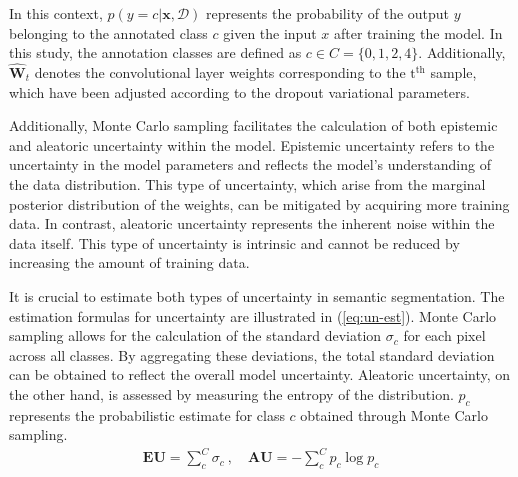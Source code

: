 In this context, $p(y=c|\mathbf{x},\mathcal{D})$ represents the probability of the output $y$ belonging to the 
annotated class $c$ given the input $x$ after training the model. In this study, the annotation classes are defined 
as $c \in C = \{0,1,2,4\}$. Additionally, $\widehat{\mathbf{W}}_{t}$ denotes the convolutional layer weights 
corresponding to the $\text{t}^{\text{th}}$ sample, which have been adjusted according to the dropout variational 
parameters. 

Additionally, Monte Carlo sampling facilitates the calculation of both epistemic and aleatoric uncertainty within 
the model. Epistemic uncertainty refers to the uncertainty in the model parameters and reflects the model's 
understanding of the data distribution. This type of uncertainty, which arise from the marginal posterior distribution 
of the weights, can be mitigated by acquiring more training data. In contrast, aleatoric uncertainty represents the 
inherent noise within the data itself. This type of uncertainty is intrinsic and cannot be reduced by increasing the 
amount of training data. 

It is crucial to estimate both types of uncertainty in semantic segmentation. The estimation formulas for uncertainty 
are illustrated in (\ref{eq:un-est}). Monte Carlo sampling allows for the calculation of the standard deviation 
$\sigma_c$ for each pixel across all classes. By aggregating these deviations, the total standard deviation can be 
obtained to reflect the overall model uncertainty. Aleatoric uncertainty, on the other hand, is assessed by measuring 
the entropy of the distribution. $p_{c}$ represents the probabilistic estimate for class $c$ obtained through Monte 
Carlo sampling. \\
\vspace{-2mm}
\begin{equation}
\begin{aligned}
    \mathbf{EU} = \sum_{c}^{C} \sigma_{c} \ , \quad
    \mathbf{AU} = -\sum_{c}^{C} p_{c} \operatorname{log} p_{c}
    \label{eq:un-est}
\end{aligned}
\end{equation}


